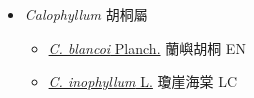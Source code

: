 
  \begin{itemize}
 \item[] \textit{Calophyllum} 胡桐屬
                    
  \begin{itemize}
        \item[] \href{http://www.theplantlist.org/tpl1.1/search?q=Calophyllum+blancoi}{\textit{C. blancoi} Planch.}   蘭嶼胡桐 EN
        \item[] \href{http://www.theplantlist.org/tpl1.1/search?q=Calophyllum+inophyllum}{\textit{C. inophyllum} L.}   瓊崖海棠 LC
  \end{itemize}
  \end{itemize}
